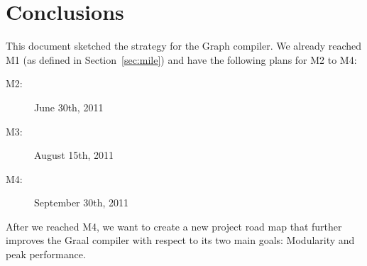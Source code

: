 \documentclass[twocolumn]{svjour3}
\begin{document}
\section{Conclusions}
\label{sec:conclusions}
This document sketched the strategy for the Graph compiler.
We already reached M1 (as defined in Section~\ref{sec:mile}) and have the following plans for M2 to M4:
\begin{description}
\item[M2:] June 30th, 2011
\item[M3:] August 15th, 2011
\item[M4:] September 30th, 2011
\end{description}
After we reached M4, we want to create a new project road map that further improves the Graal compiler with respect to its two main goals: Modularity and peak performance.
\end{document}
